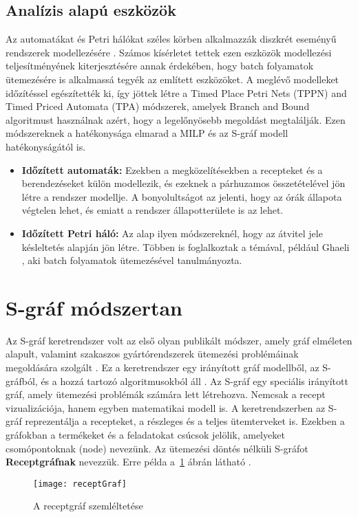 \subsection{Analízis alapú eszközök}
Az automatákat és Petri hálókat széles körben alkalmazzák diszkrét eseményű rendszerek modellezésére \cite{cassandras}.
Számos kísérletet tettek ezen eszközök modellezési teljesítményének kiterjesztésére annak érdekében, hogy batch folyamatok ütemezésére is alkalmassá tegyék az említett eszközöket.
A meglévő modelleket időzítéssel egészítették ki, így jöttek létre a Timed Place Petri Nets (TPPN) and Timed Priced Automata (TPA) módszerek, amelyek Branch and Bound algoritmust használnak azért, hogy a legelőnyösebb megoldást megtalálják.
Ezen módszereknek a hatékonysága elmarad a MILP és az S-gráf modell hatékonyságától is.
\begin{itemize}
	\item[] \textbf{Időzített automaták:}
	Ezekben a megközelítésekben a recepteket és a berendezéseket külön modellezik, és ezeknek a párhuzamos összetételével jön létre a rendszer modellje.
	A bonyolultságot az jelenti, hogy az órák állapota végtelen lehet, és emiatt a rendszer állapotterülete is az lehet.
	\item[] \textbf{Időzített Petri háló:}
	Az alap ilyen módszereknél, hogy az átvitel jele késleltetés alapján jön létre.
	Többen is foglalkoztak a témával, például Ghaeli \cite{ghaeli}, aki batch folyamatok ütemezésével tanulmányozta.
\end{itemize}

\section{S-gráf módszertan}
Az S-gráf keretrendszer volt az első olyan publikált módszer, amely gráf elméleten alapult, valamint szakaszos gyártórendszerek ütemezési problémáinak megoldására szolgált \cite{combtech}.
Ez a keretrendszer egy irányított gráf modellből, az S-gráfból, és a hozzá tartozó algoritmusokból áll \cite{combframe}.
Az S-gráf egy speciális irányított gráf, amely ütemezési problémák számára lett létrehozva.
Nemcsak a recept vizualizációja, hanem egyben matematikai modell is.
A keretrendszerben az S-gráf reprezentálja a recepteket, a részleges és a teljes ütemterveket is.
Ezekben a gráfokban a termékeket és a feladatokat csúcsok jelölik, amelyeket csomópontoknak (node) nevezünk.
Az ütemezési döntés nélküli S-gráfot \textbf{Receptgráfnak} nevezzük.
Erre példa a~\ref{receptGraf} ábrán látható \cite{Hegyhati}. 
\begin{figure}[H]	
\begin{center}
\texttt{[image: receptGraf]}
\caption{A receptgráf szemléltetése}
\label{receptGraf}
\end{center}
\end{figure}

